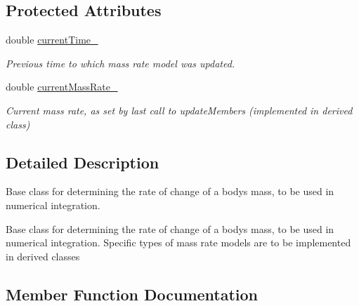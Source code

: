 \subsection*{Protected Attributes}
\begin{DoxyCompactItemize}
\item 
double \hyperlink{classtudat_1_1basic__astrodynamics_1_1MassRateModel_a036c0d6616d8bc654cb84276f1fd667c}{current\+Time\+\_\+}\hypertarget{classtudat_1_1basic__astrodynamics_1_1MassRateModel_a036c0d6616d8bc654cb84276f1fd667c}{}\label{classtudat_1_1basic__astrodynamics_1_1MassRateModel_a036c0d6616d8bc654cb84276f1fd667c}

\begin{DoxyCompactList}\small\item\em Previous time to which mass rate model was updated. \end{DoxyCompactList}\item 
double \hyperlink{classtudat_1_1basic__astrodynamics_1_1MassRateModel_a0275d5e4455508410ca4effa18e2c1ce}{current\+Mass\+Rate\+\_\+}\hypertarget{classtudat_1_1basic__astrodynamics_1_1MassRateModel_a0275d5e4455508410ca4effa18e2c1ce}{}\label{classtudat_1_1basic__astrodynamics_1_1MassRateModel_a0275d5e4455508410ca4effa18e2c1ce}

\begin{DoxyCompactList}\small\item\em Current mass rate, as set by last call to update\+Members (implemented in derived class) \end{DoxyCompactList}\end{DoxyCompactItemize}


\subsection{Detailed Description}
Base class for determining the rate of change of a body\textquotesingle{}s mass, to be used in numerical integration. 

Base class for determining the rate of change of a body\textquotesingle{}s mass, to be used in numerical integration. Specific types of mass rate models are to be implemented in derived classes 

\subsection{Member Function Documentation}
